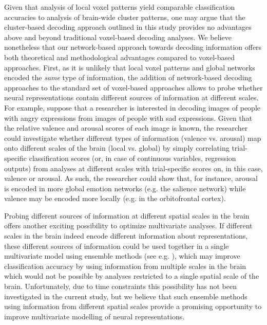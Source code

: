 \documentclass[jou,12pt,a4paper]{apa6}
\begin{document}
Given that analysis of local voxel patterns yield comparable classification accuracies to analysis of brain-wide cluster patterns, one may argue that the cluster-based decoding approach outlined in this study provides no advantages above and beyond traditional voxel-based decoding analyses. We believe nonetheless that our network-based approach towards decoding information offers both theoretical and methodological advantages compared to voxel-based approaches. First, as it is unlikely that local voxel patterns and global networks encoded the \emph{same} type of information, the addition of network-based decoding approaches to the standard set of voxel-based approaches allows to probe whether neural representations contain different sources of information at different scales. For example, suppose that a researcher is interested in decoding images of people with angry expressions from images of people with sad expressions. Given that the relative valence and arousal scores of each image is known, the researcher could investigate whether different types of information (valence vs. arousal) map onto different scales of the brain (local vs. global) by simply correlating trial-specific classification scores (or, in case of continuous variables, regression outputs) from analyses at different scales with trial-specific scores on, in this case, valence or arousal. As such, the researcher could show that, for instance, arousal is encoded in more global emotion networks (e.g. the salience network) while valence may be encoded more locally (e.g. in the orbitofrontal cortex).  

Probing different sources of information at different spatial scales in the brain offers another exciting possibility to optimize multivariate analyses. If different scales in the brain indeed encode different information about representations, these different sources of information could be used together in a single multivariate model using ensemble methods (see e.g. ), which may improve classification accuracy by using information from multiple scales in the brain which would not be possible by analyses restricted to a single spatial scale of the brain. Unfortunately, due to time constraints this possibility has not been investigated in the current study, but we believe that such ensemble methods using information from different spatial scales provide a promising opportunity to improve multivariate modelling of neural representations.
\end{document}
